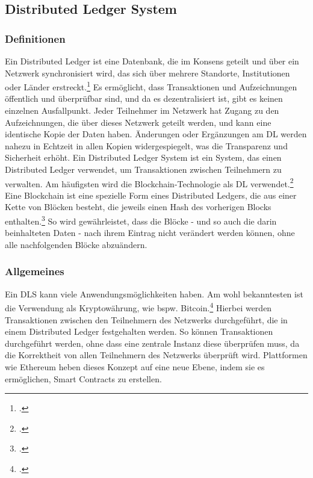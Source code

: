 \noindent

\subsection{Distributed Ledger System}
\label{sec:definition-dls}

\subsubsection{Definitionen}
Ein Distributed Ledger ist eine Datenbank, die im Konsens geteilt und über ein Netzwerk synchronisiert wird, das sich über mehrere Standorte, Institutionen oder Länder erstreckt.\footcite[Vgl. hierzu und im Folgenden][]{w1,w2} 
Es ermöglicht, dass Transaktionen und Aufzeichnungen öffentlich und überprüfbar sind, und da es dezentralisiert ist, gibt es keinen einzelnen Ausfallpunkt. 
Jeder Teilnehmer im Netzwerk hat Zugang zu den Aufzeichnungen, die über dieses Netzwerk geteilt werden, und kann eine identische Kopie der Daten haben. Änderungen oder Ergänzungen am DL werden nahezu in Echtzeit in allen Kopien widergespiegelt, was die Transparenz und Sicherheit erhöht.
\bigbreak
\noindent
Ein Distributed Ledger System ist ein System, das einen Distributed Ledger verwendet, um Transaktionen zwischen Teilnehmern zu verwalten. Am häufigsten wird die Blockchain-Technologie als DL verwendet.\footcite[Vgl.][]{w3}
\bigbreak
\noindent
Eine Blockchain ist eine spezielle Form eines Distributed Ledgers, die aus einer Kette von Blöcken besteht, die jeweils einen Hash des vorherigen Blocks enthalten.\footcite[Vgl. hierzu und im Folgenden][16]{q3} 
So wird gewährleistet, dass die Blöcke - und so auch die darin beinhalteten Daten - nach ihrem Eintrag nicht verändert werden können, ohne alle nachfolgenden Blöcke abzuändern.

\subsubsection{Allgemeines}
Ein DLS kann viele Anwendungsmöglichkeiten haben. Am wohl bekanntesten ist die Verwendung als Kryptowährung, wie bspw. Bitcoin.\footcite[Vgl. hierzu und im Folgenden][1]{q4} 
Hierbei werden Transaktionen zwischen den Teilnehmern des Netzwerks durchgeführt, die in einem Distributed Ledger festgehalten werden. 
So können Transaktionen durchgeführt werden, ohne dass eine zentrale Instanz diese überprüfen muss, da die Korrektheit von allen Teilnehmern des Netzwerks überprüft wird.
\bigbreak
\noindent
Plattformen wie Ethereum heben dieses Konzept auf eine neue Ebene, indem sie es ermöglichen, Smart Contracts zu erstellen.

